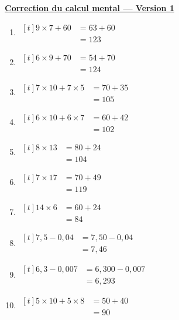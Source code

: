 \documentclass[12pt,a4paper]{article}
\newcommand{\titreversion}[1]{%
  \begin{center}%
    {\Large\underline{\textbf{#1}}}%
  \end{center}%
}
\begin{document}
\titreversion{Correction du calcul mental --- Version 1}
\begin{enumerate}
\item {$\begin{aligned}[t]
9\times 7+60 &= 63+60\\
             &= \boxed{123}
\end{aligned}$}
\item {$\begin{aligned}[t]
6\times 9+70 &= 54+70\\
             &= \boxed{124}
\end{aligned}$}
\item {$\begin{aligned}[t]
7\times 10+7\times 5 &= 70+35\\
                     &= \boxed{105}
\end{aligned}$}
\item {$\begin{aligned}[t]
6\times 10+6\times 7 &= 60+42\\
                     &= \boxed{102}
\end{aligned}$}
\item {$\begin{aligned}[t]
8\times 13 &= 80+24\\
           &= \boxed{104}
\end{aligned}$}
\item {$\begin{aligned}[t]
7\times 17 &= 70+49\\
           &= \boxed{119}
\end{aligned}$}
\item {$\begin{aligned}[t]
14\times 6 &= 60+24\\
           &= \boxed{84}
\end{aligned}$}
\item {$\begin{aligned}[t]
7{,}5-0{,}04 &= 7{,}50-0{,}04\\
             &= \boxed{7{,}46}
\end{aligned}$}
\item {$\begin{aligned}[t]
6{,}3-0{,}007 &= 6{,}300-0{,}007\\
              &= \boxed{6{,}293}
\end{aligned}$}
\item {$\begin{aligned}[t]
5\times 10+5\times 8 &= 50+40\\
                     &= \boxed{90}
\end{aligned}$}
\end{enumerate}
\newpage
\end{document}

